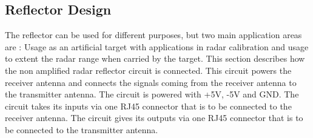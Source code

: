 \subsection{Reflector Design}
 The reflector can be used for different purposes, but two main application areas are : Usage as an artificial target with applications in radar calibration and usage to extent the radar range when carried by the target.
This section describes how the non amplified radar reflector circuit is connected. This circuit powers the receiver antenna and connects the signals coming from the receiver antenna to the transmitter antenna.
The circuit is powered with +5V, -5V and GND. The circuit takes its inputs via one RJ45 connector that is to be connected to the receiver antenna. The circuit gives its outputs via one RJ45 connector that is to be connected to the transmitter antenna.

